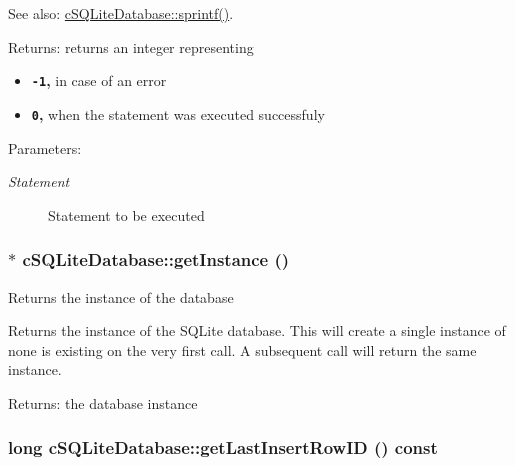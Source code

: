 \begin{Desc}
\item[See also:]\hyperlink{classcSQLiteDatabase_cdc42326657aea81fd26da6500642381}{cSQLiteDatabase::sprintf()}.\end{Desc}
\begin{Desc}
\item[Returns:]returns an integer representing\begin{itemize}
\item {\bf {\tt -1},} in case of an error\item {\bf {\tt 0},} when the statement was executed successfuly \end{itemize}
\end{Desc}
\begin{Desc}
\item[Parameters:]
\begin{description}
\item[{\em Statement}]Statement to be executed \end{description}
\end{Desc}
\hypertarget{classcSQLiteDatabase_a39756509bd68fd8e335cc9cc40c6f26}{
\subsubsection[{getInstance}]{ $\ast$ cSQLiteDatabase::getInstance ()}}
\label{classcSQLiteDatabase_a39756509bd68fd8e335cc9cc40c6f26}


Returns the instance of the database

Returns the instance of the SQLite database. This will create a single instance of none is existing on the very first call. A subsequent call will return the same instance.

\begin{Desc}
\item[Returns:]the database instance \end{Desc}
\hypertarget{classcSQLiteDatabase_408e5de345a74f2540ee1cea3c97cd51}{
\subsubsection[{getLastInsertRowID}]{\setlength{\rightskip}{0pt plus 5cm}long cSQLiteDatabase::getLastInsertRowID () const}}
\label{classcSQLiteDatabase_408e5de345a74f2540ee1cea3c97cd51}


